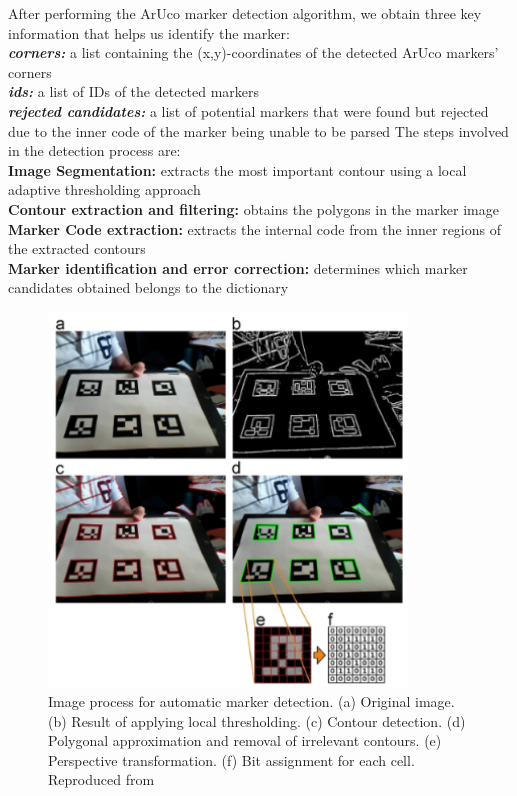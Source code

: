 \documentclass[12pt,a4paper]{report}
\def\aruco{ArUco }
\begin{document}
After performing the \aruco marker detection algorithm, we obtain three key information that helps us identify the marker:\\
\textbf{\textit{corners:}} a list containing the (x,y)-coordinates of the detected \aruco markers' corners\\
 \textbf{\textit{ids:}} a list of IDs of the detected markers\\
\textbf{\textit{rejected candidates:}} a list of potential markers that were found but rejected due to the inner code of the marker being unable to be parsed
\newpage
The steps involved in the detection process \cite{garrido2014automatic} are:\\
\textbf{Image Segmentation:} extracts the most important contour using a local adaptive thresholding approach\\
\textbf{Contour extraction and filtering:} obtains the polygons in the marker image\\
\textbf{Marker Code extraction:} extracts the internal code from the inner regions of the extracted contours\\
\textbf{Marker identification and error correction:} determines which marker candidates obtained belongs to the dictionary

\begin{figure}[h]
    \centering
    \includegraphics[width=0.85\textwidth]{Images/Image detection process.png}
    \caption[Image process for automatic marker detection]{Image process for automatic marker detection. (a) Original image. (b) Result of applying local thresholding. (c) Contour detection. (d) Polygonal approximation and removal of irrelevant contours. (e) Perspective transformation. (f) Bit assignment for each cell. Reproduced from \cite{garrido2014automatic}}
    \label{fig:Figure 3}
\end{figure}
\end{document}

